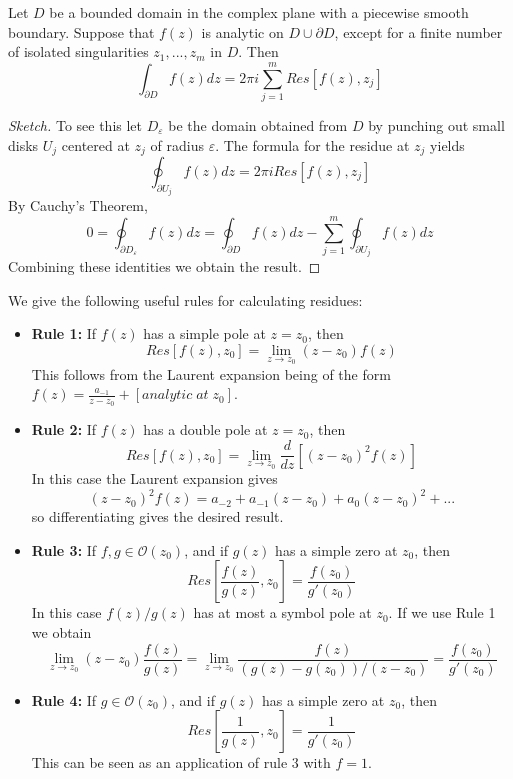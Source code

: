 \documentclass[12pt, a4paper, oneside, openright, titlepage]{book}
\begin{document}
\begin{namthm}
    Let $D$ be a bounded domain in the complex plane with a piecewise smooth boundary. Suppose that $f(z)$ is analytic on $D\cup \partial D$, except for a finite number of isolated singularities $z_1,...,z_m$ in $D$. Then \begin{equation*}
        \int_{\partial D}f(z)dz = 2\pi i\sum_{j=1}^mRes[f(z),z_j]
    \end{equation*}
\end{namthm}
\begin{proof}[Sketch]
    To see this let $D_{\varepsilon}$ be the domain obtained from $D$ by punching out small disks $U_j$ centered at $z_j$ of radius $\varepsilon$. The formula for the residue at $z_j$ yields \begin{equation*}
        \oint_{\partial U_j}f(z)dz = 2\pi iRes[f(z),z_j]
    \end{equation*}
    By Cauchy's Theorem, \begin{equation*}
        0 = \oint_{\partial D_{\varepsilon}}f(z)dz = \oint_{\partial D}f(z)dz - \sum_{j=1}^{m}\oint_{\partial U_j}f(z)dz
    \end{equation*}
    Combining these identities we obtain the result.
\end{proof}


\begin{proc}
    We give the following useful rules for calculating residues:\begin{itemize}
        \item \textbf{Rule 1:} If $f(z)$ has a simple pole at $z = z_0$, then $$Res[f(z),z_0] = \lim\limits_{z\rightarrow z_0}(z-z_0)f(z)$$
            This follows from the Laurent expansion being of the form $f(z) = \frac{a_{-1}}{z-z_0}+[analytic\;at\;z_0]$.
        \item \textbf{Rule 2:} If $f(z)$ has a double pole at $z = z_0$, then $$Res[f(z),z_0] = \lim\limits_{z\rightarrow z_0}\frac{d}{dz}[(z-z_0)^2f(z)]$$
            In this case the Laurent expansion gives \begin{equation*}
                (z-z_0)^2f(z) = a_{-2}+a_{-1}(z-z_0)+a_0(z-z_0)^2+...
            \end{equation*}
            so differentiating gives the desired result.
        \item \textbf{Rule 3:} If $f,g \in \mathcal{O}(z_0)$, and if $g(z)$ has a simple zero at $z_0$, then $$Res\left[\frac{f(z)}{g(z)},z_0\right] = \frac{f(z_0)}{g'(z_0)}$$ In this case $f(z)/g(z)$ has at most a symbol pole at $z_0$. If we use Rule 1 we obtain \begin{equation*}
                \lim\limits_{z\rightarrow z_0}(z-z_0)\frac{f(z)}{g(z)} = \lim\limits_{z\rightarrow z_0}\frac{f(z)}{(g(z)-g(z_0))/(z-z_0)} = \frac{f(z_0)}{g'(z_0)}
        \end{equation*}
        \item \textbf{Rule 4:} If $g \in \mathcal{O}(z_0)$, and if $g(z)$ has a simple zero at $z_0$, then $$Res\left[\frac{1}{g(z)},z_0\right] = \frac{1}{g'(z_0)}$$ This can be seen as an application of rule $3$ with $f = 1$.
    \end{itemize}
\end{proc}
\end{document}
